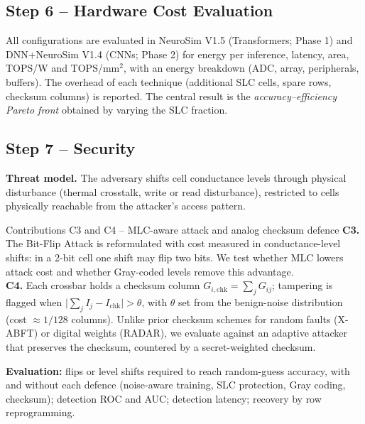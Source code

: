 \documentclass[10pt,a4paper]{article}
\begin{document}
\subsection{Step 6 -- Hardware Cost Evaluation}
All configurations are evaluated in NeuroSim V1.5 (Transformers; Phase 1) and DNN+NeuroSim V1.4 (CNNs;
Phase 2) for energy per inference, latency, area, TOPS/W and TOPS/mm$^2$, with an energy breakdown (ADC,
array, peripherals, buffers). The overhead of each technique (additional SLC cells, spare rows, checksum
columns) is reported. The central result is the \emph{accuracy--efficiency Pareto front} obtained by
varying the SLC fraction.

\subsection{Step 7 -- Security}
\textbf{Threat model.} The adversary shifts cell conductance levels through physical disturbance
(thermal crosstalk, write or read disturbance), restricted to cells physically reachable from the
attacker's access pattern.

\begin{contribbox}{Contributions C3 and C4 -- MLC-aware attack and analog checksum defence}
\textbf{C3.} The Bit-Flip Attack is reformulated with cost measured in conductance-level shifts: in a
2-bit cell one shift may flip two bits. We test whether MLC lowers attack cost and whether Gray-coded
levels remove this advantage.\\[2pt]
\textbf{C4.} Each crossbar holds a checksum column $G_{i,\mathrm{chk}}=\sum_j G_{ij}$; tampering is
flagged when $\big|\sum_j I_j-I_{\mathrm{chk}}\big|>\theta$, with $\theta$ set from the benign-noise
distribution (cost $\approx1/128$ columns). Unlike prior checksum schemes for random faults (X-ABFT) or
digital weights (RADAR), we evaluate against an adaptive attacker that preserves the checksum, countered
by a secret-weighted checksum.
\end{contribbox}

\textbf{Evaluation:} flips or level shifts required to reach random-guess accuracy, with and without
each defence (noise-aware training, SLC protection, Gray coding, checksum); detection ROC and AUC;
detection latency; recovery by row reprogramming.
\end{document}
